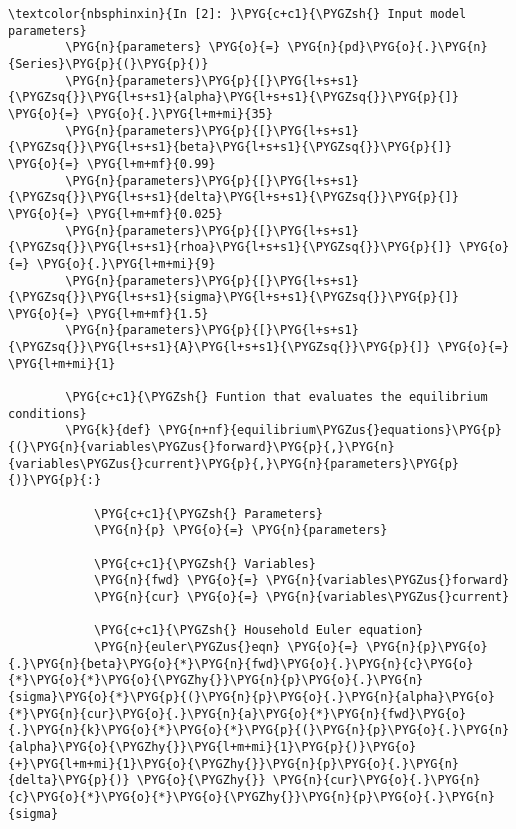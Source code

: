 \documentclass[letterpaper,10pt,openany,oneside,english]{sphinxmanual}
\begin{document}
\begin{Verbatim}[commandchars=\\\{\}]
\textcolor{nbsphinxin}{In [2]: }\PYG{c+c1}{\PYGZsh{} Input model parameters}
        \PYG{n}{parameters} \PYG{o}{=} \PYG{n}{pd}\PYG{o}{.}\PYG{n}{Series}\PYG{p}{(}\PYG{p}{)}
        \PYG{n}{parameters}\PYG{p}{[}\PYG{l+s+s1}{\PYGZsq{}}\PYG{l+s+s1}{alpha}\PYG{l+s+s1}{\PYGZsq{}}\PYG{p}{]}  \PYG{o}{=} \PYG{o}{.}\PYG{l+m+mi}{35}
        \PYG{n}{parameters}\PYG{p}{[}\PYG{l+s+s1}{\PYGZsq{}}\PYG{l+s+s1}{beta}\PYG{l+s+s1}{\PYGZsq{}}\PYG{p}{]}  \PYG{o}{=} \PYG{l+m+mf}{0.99}
        \PYG{n}{parameters}\PYG{p}{[}\PYG{l+s+s1}{\PYGZsq{}}\PYG{l+s+s1}{delta}\PYG{l+s+s1}{\PYGZsq{}}\PYG{p}{]}   \PYG{o}{=} \PYG{l+m+mf}{0.025}
        \PYG{n}{parameters}\PYG{p}{[}\PYG{l+s+s1}{\PYGZsq{}}\PYG{l+s+s1}{rhoa}\PYG{l+s+s1}{\PYGZsq{}}\PYG{p}{]} \PYG{o}{=} \PYG{o}{.}\PYG{l+m+mi}{9}
        \PYG{n}{parameters}\PYG{p}{[}\PYG{l+s+s1}{\PYGZsq{}}\PYG{l+s+s1}{sigma}\PYG{l+s+s1}{\PYGZsq{}}\PYG{p}{]} \PYG{o}{=} \PYG{l+m+mf}{1.5}
        \PYG{n}{parameters}\PYG{p}{[}\PYG{l+s+s1}{\PYGZsq{}}\PYG{l+s+s1}{A}\PYG{l+s+s1}{\PYGZsq{}}\PYG{p}{]} \PYG{o}{=} \PYG{l+m+mi}{1}
        
        \PYG{c+c1}{\PYGZsh{} Funtion that evaluates the equilibrium conditions}
        \PYG{k}{def} \PYG{n+nf}{equilibrium\PYGZus{}equations}\PYG{p}{(}\PYG{n}{variables\PYGZus{}forward}\PYG{p}{,}\PYG{n}{variables\PYGZus{}current}\PYG{p}{,}\PYG{n}{parameters}\PYG{p}{)}\PYG{p}{:}
        
            \PYG{c+c1}{\PYGZsh{} Parameters}
            \PYG{n}{p} \PYG{o}{=} \PYG{n}{parameters}
        
            \PYG{c+c1}{\PYGZsh{} Variables}
            \PYG{n}{fwd} \PYG{o}{=} \PYG{n}{variables\PYGZus{}forward}
            \PYG{n}{cur} \PYG{o}{=} \PYG{n}{variables\PYGZus{}current}
        
            \PYG{c+c1}{\PYGZsh{} Household Euler equation}
            \PYG{n}{euler\PYGZus{}eqn} \PYG{o}{=} \PYG{n}{p}\PYG{o}{.}\PYG{n}{beta}\PYG{o}{*}\PYG{n}{fwd}\PYG{o}{.}\PYG{n}{c}\PYG{o}{*}\PYG{o}{*}\PYG{o}{\PYGZhy{}}\PYG{n}{p}\PYG{o}{.}\PYG{n}{sigma}\PYG{o}{*}\PYG{p}{(}\PYG{n}{p}\PYG{o}{.}\PYG{n}{alpha}\PYG{o}{*}\PYG{n}{cur}\PYG{o}{.}\PYG{n}{a}\PYG{o}{*}\PYG{n}{fwd}\PYG{o}{.}\PYG{n}{k}\PYG{o}{*}\PYG{o}{*}\PYG{p}{(}\PYG{n}{p}\PYG{o}{.}\PYG{n}{alpha}\PYG{o}{\PYGZhy{}}\PYG{l+m+mi}{1}\PYG{p}{)}\PYG{o}{+}\PYG{l+m+mi}{1}\PYG{o}{\PYGZhy{}}\PYG{n}{p}\PYG{o}{.}\PYG{n}{delta}\PYG{p}{)} \PYG{o}{\PYGZhy{}} \PYG{n}{cur}\PYG{o}{.}\PYG{n}{c}\PYG{o}{*}\PYG{o}{*}\PYG{o}{\PYGZhy{}}\PYG{n}{p}\PYG{o}{.}\PYG{n}{sigma}
        

\end{Verbatim}
\end{document}
